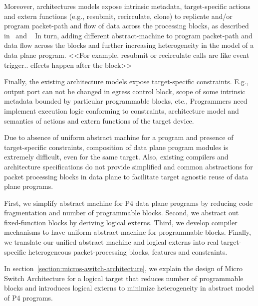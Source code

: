 \documentclass[10pt,sigconf,letterpaper,anonymous]{acmart}
\begin{document}
Moreover, architectures models expose intrinsic metadata, target-specific actions and extern functions (e.g., resubmit, recirculate, clone) to replicate and/or program packet-path and flow of data across the processing blocks, as described in~\cite{simple_switch.md} and ~\cite{psa}
In turn, adding different abstract-machine to program packet-path and data flow across the blocks and further increasing heterogeneity in the model of a data plane program.
<<For example, resubmit or recirculate calls are like event trigger.. effects happen after the block>>

Finally, the existing architecture models expose target-specific constraints.
E.g., output port can not be changed in egress control block, scope of some intrinsic metadata bounded by particular programmable blocks, etc.,  
Programmers need implement execution logic conforming to constraints, architecture model and semantics of actions and extern functions of the target device.


Due to absence of uniform abstract machine for a program and presence of target-specific constraints, composition of data plane program modules is extremely difficult, even for the same target. 
Also, existing compilers and architecture specifications do not provide simplified and common abstractions for packet processing blocks in data plane to facilitate target agnostic reuse of data plane programs.


First, we simplify abstract machine for P4 data plane programs by reducing code fragmentation and number of programmable blocks.
Second, we abstract out fixed-function blocks by deriving logical externs.
Third, we develop compiler mechanisms to have uniform abstract-machine for programmable blocks.
Finally, we translate our unified abstract machine and logical externs into real target-specific heterogeneous packet-processing blocks, features and constraints.

In section~\ref{section:micros-awitch-architecture}, we explain the design of Micro Switch Architecture for a logical target that reduces number of programmable blocks and introduces logical externs to minimize heterogeneity in abstract model of P4 programs.



\end{document}
